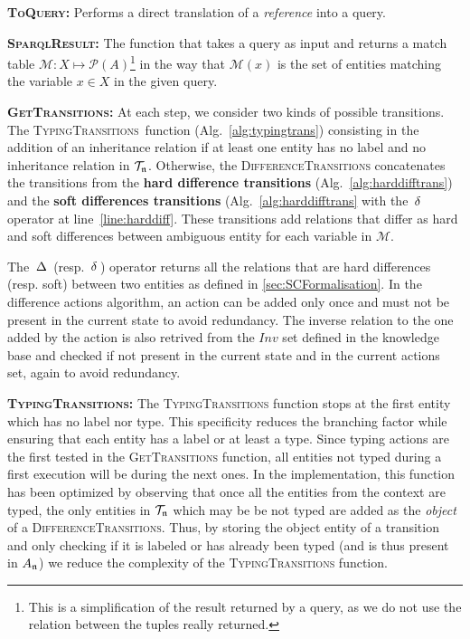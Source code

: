 \documentclass[a4paper,11pt,twoside]{StyleThese}
\begin{document}
\textbf{\textsc{ToQuery}:}
Performs a direct translation of a \textit{reference} into a \sparql{} query.

\textbf{\textsc{SparqlResult}:}
The function that takes a \sparql{} query as input and returns a match table $\mathcal{M}: X \mapsto \mathcal{P}(A)$\footnote{This is a simplification of the result returned by a \sparql{} query, as we do not use the relation between the tuples really returned.} in the way that $\mathcal{M}(x)$ is the set of entities matching the variable $x \in X$ in the given query.

\textbf{\textsc{GetTransitions}:}
At each step, we consider two kinds of possible transitions. The \textsc{TypingTransitions}~function (Alg.~\ref{alg:typingtrans}) consisting in the addition of an inheritance relation if at least one entity has no label and no inheritance relation in $\mathcal{T}_{\mathfrak{n}}$. Otherwise, the \textsc{DifferenceTransitions} concatenates the transitions from the \textbf{hard difference transitions} (Alg.~\ref{alg:harddifftrans}) and the \textbf{soft differences transitions} (Alg.~\ref{alg:harddifftrans} with the $\,\delta\,$ operator at line~\ref{line:harddiff}. These transitions add relations that differ as hard and soft differences between ambiguous entity for each variable in $\mathcal{M}$.

The $\,\Delta\,$ (resp. $\,\delta\,$) operator returns all the relations that are hard differences (resp. soft) between two entities as defined in \ref{sec:SCFormalisation}. In the difference actions algorithm, an action can be added only once and must not be present in the current state to avoid redundancy. The inverse relation to the one added by the action is also retrived from the $Inv$ set defined in the knowledge base and checked if not present in the current state and in the current actions set, again to avoid redundancy. 

\textbf{\textsc{TypingTransitions}:}
The \textsc{TypingTransitions} function stops at the first entity which has no label nor type. This specificity reduces the branching factor while ensuring that each entity has a label or at least a type. Since typing actions are the first tested in the \textsc{GetTransitions} function, all entities not typed during a first execution will be during the next ones. In the implementation, this function has been optimized by observing that once all the entities from the context are typed, the only entities in $\mathcal{T}_{\mathfrak{n}}$ which may be be not typed are added as the \textit{object} of a \textsc{DifferenceTransitions}. Thus, by storing the object entity of a transition and only checking if it is labeled or has already been typed (and is thus present in $A_{\mathfrak{n}}$) we reduce the complexity of the \textsc{TypingTransitions} function.
\end{document}
